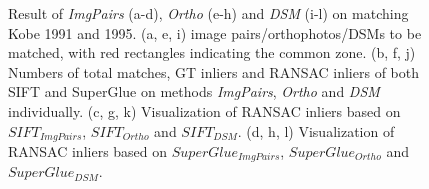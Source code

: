 \begin{figure}[htbp]
\begin{center}
        \caption{{\scriptsize Result of \textit{ImgPairs} (a-d), \textit{Ortho} (e-h) and \textit{DSM} (i-l) on matching Kobe 1991 and 1995. (a, e, i) image pairs/orthophotos/DSMs to be matched, with red rectangles indicating the common zone. (b, f, j) Numbers of total matches, GT inliers and RANSAC inliers of both SIFT and SuperGlue on methods \textit{ImgPairs}, \textit{Ortho} and \textit{DSM} individually. (c, g, k) Visualization of RANSAC inliers based on $SIFT_{ImgPairs}$, $SIFT_{Ortho}$ and $SIFT_{DSM}$. (d, h, l) Visualization of RANSAC inliers based on $SuperGlue_{ImgPairs}$, $SuperGlue_{Ortho}$ and $SuperGlue_{DSM}$.}}        
        \label{MatchVizKobe1991DSM}
    \end{center}
\end{figure} 






